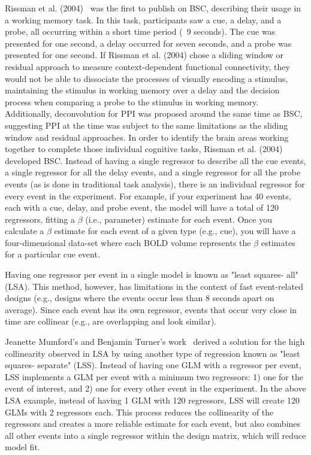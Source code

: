 \documentclass[phd,figures,tables,ackpage,abstractpage,publicabstractpage]{uithesis}
\begin{document}
Rissman et al. (2004)~\cite{Rissman2004} was the first to publish on BSC,
describing their usage in a working memory task.
In this task, participants saw a cue, a delay, and a probe, all occurring
within a short time period (~9 seconds).
The cue was presented for one second, a delay occurred for seven seconds,
and a probe was presented for one second.
If Rissman et al. (2004) chose a sliding window or residual approach to measure context-dependent functional connectivity,
they would not be able to dissociate the processes of visually encoding a stimulus,
maintaining the stimulus in working memory over a delay and the decision process when comparing a
probe to the stimulus in working memory.
Additionally, deconvolution for PPI was proposed around the same time as BSC,
suggesting PPI at the time was subject to the same limitations as
the sliding window and residual approaches.
In order to identify the brain areas working together to complete those individual cognitive tasks,
Rissman et al. (2004) developed BSC.
Instead of having a single regressor to describe all the cue events,
a single regressor for all the delay events, and a single regressor for all the
probe events (as is done in traditional task analysis),
there is an individual regressor for every event in the experiment.
For example, if your experiment has 40 events, each with a cue, delay, and
probe event, the model will have a total of 120 regressors, fitting a $\beta$
(i.e., parameter) estimate for each event.
Once you calculate a $\beta$ estimate for each event of a given type
(e.g., cue), you will have a four-dimensional data-set where each BOLD volume
represents the $\beta$ estimates for a particular cue event.

Having one regressor per event in a single model is known as "least squares- all" (LSA).
This method, however, has limitations in the context of fast event-related
designs (e.g., designs where the events occur less than 8
seconds apart on average).
Since each event has its own regressor, events that occur very close in time
are collinear (e.g., are overlapping and look similar).

Jeanette Mumford's and Benjamin Turner's work~\cite{Turner2010,Mumford2012} derived a solution for
the high collinearity observed in LSA by using another
type of regression known as "least squares- separate" (LSS).
Instead of having one GLM with a regressor per event,
LSS implements a GLM per event with a minimum two regressors:
1) one for the event of interest, and 2) one for every other event in the
experiment.
In the above LSA example, instead of having 1 GLM with 120 regressors,
LSS will create 120 GLMs with 2 regressors each.
This process reduces the collinearity of the regressors and creates a more reliable
estimate for each event, but also combines all other events into a single regressor
within the design matrix, which will reduce model fit.
\end{document}

